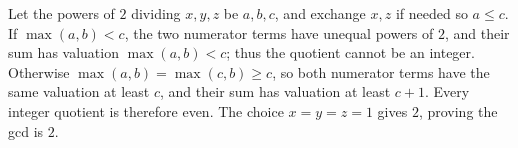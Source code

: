 Let the powers of $ 2 $ dividing $ x,y,z $ be $ a,b,c $, and exchange $ x,z $ if needed so $ a\le c $. If $\max(a,b)<c $, the two numerator terms have unequal powers of $ 2 $, and their sum has valuation $\max(a,b)<c $; thus the quotient cannot be an integer. Otherwise $\max(a,b)=\max(c,b)\ge c $, so both numerator terms have the same valuation at least $ c $, and their sum has valuation at least $ c+1 $. Every integer quotient is therefore even. The choice $ x=y=z=1 $ gives $ 2 $, proving the gcd is $\boxed2 $.
